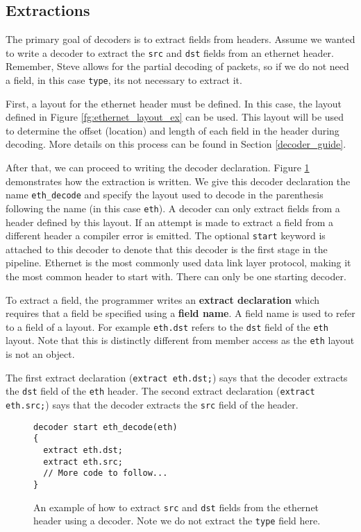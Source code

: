 \subsection{Extractions} \label{decoder_extract_tut}

The primary goal of decoders is to extract fields from headers. Assume we wanted to write a decoder to extract the \texttt{src} and \texttt{dst} fields from an ethernet header. Remember, Steve allows for the partial decoding of packets, so if we do not need a field, in this case \texttt{type}, its not necessary to extract it. 

First, a layout for the ethernet header must be defined. In this case, the layout defined in Figure \ref{fg:ethernet_layout_ex} can be used. This layout will be used to determine the offset (location) and length of each field in the header during decoding. More details on this process can be found in Section \ref{decoder_guide}. 

After that, we can proceed to writing the decoder declaration. Figure \ref{fg:extract_ex} demonstrates how the extraction is written. We give this decoder declaration the name \texttt{eth\_decode} and specify the layout used to decode in the parenthesis following the name (in this case \texttt{eth}). A decoder can only extract fields from a header defined by this layout. If an attempt is made to extract a field from a different header a compiler error is emitted. The optional \texttt{start} keyword is attached to this decoder to denote that this decoder is the first stage in the pipeline. Ethernet is the most commonly used data link layer protocol, making it the most common header to start with. There can only be one starting decoder. 

To extract a field, the programmer writes an \textbf{extract declaration} which requires that a field be specified using a \textbf{field name}. A field name is used to refer to a field of a layout. For example \texttt{eth.dst} refers to the \texttt{dst} field of the \texttt{eth} layout.  Note that this is distinctly different from member access as the \texttt{eth} layout is not an object. 

The first extract declaration (\texttt{extract eth.dst;}) says that the decoder extracts the \texttt{dst} field of the \texttt{eth} header. The second extract declaration (\texttt{extract eth.src;}) says that the decoder extracts the \texttt{src} field of the  header. 

\begin{figure}
\begin{lstlisting}
decoder start eth_decode(eth)
{
  extract eth.dst;
  extract eth.src;
  // More code to follow...
}
\end{lstlisting}
\caption{An example of how to extract \texttt{src} and \texttt{dst} fields from the ethernet header using a decoder. Note we do not extract the \texttt{type} field here.}
\label{fg:extract_ex}
\end{figure}

